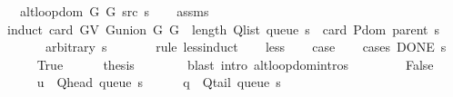 \begin{isabellebody}
\ \ \ {\isachardoublequoteopen}alt{\isacharunderscore}{\kern0pt}loop{\isacharunderscore}{\kern0pt}dom\ {\isacharparenleft}{\kern0pt}G{}{\isacharcomma}{\kern0pt}\ G{}{\isacharcomma}{\kern0pt}\ src{\isacharcomma}{\kern0pt}\ s{\isacharparenright}{\kern0pt}{\isachardoublequoteclose}\isanewline
%
\isadelimproof
\ \ %
\endisadelimproof
%
\isatagproof
{}\isamarkupfalse%
\ assms\isanewline
{}\isamarkupfalse%
\ {\isacharparenleft}{\kern0pt}induct\ {\isachardoublequoteopen}card\ {\isacharparenleft}{\kern0pt}G{\isachardot}{\kern0pt}V\ {\isacharparenleft}{\kern0pt}G{\isachardot}{\kern0pt}union\ G{}\ G{}{\isacharparenright}{\kern0pt}{\isacharparenright}{\kern0pt}\ {\isacharplus}{\kern0pt}\ length\ {\isacharparenleft}{\kern0pt}Q{\isacharunderscore}{\kern0pt}list\ {\isacharparenleft}{\kern0pt}queue\ s{\isacharparenright}{\kern0pt}{\isacharparenright}{\kern0pt}\ {\isacharminus}{\kern0pt}\ card\ {\isacharparenleft}{\kern0pt}P{\isachardot}{\kern0pt}dom\ {\isacharparenleft}{\kern0pt}parent\ s{\isacharparenright}{\kern0pt}{\isacharparenright}{\kern0pt}{\isachardoublequoteclose}\isanewline
\ \ \ \ \ \ \ arbitrary{\isacharcolon}{\kern0pt}\ s\isanewline
\ \ \ \ \ \ \ rule{\isacharcolon}{\kern0pt}\ less{\isacharunderscore}{\kern0pt}induct{\isacharparenright}{\kern0pt}\isanewline
\ \ \isamarkupfalse%
\ less\isanewline
\ \ \isamarkupfalse%
\ {\isacharquery}{\kern0pt}case\isanewline
\ \ \isamarkupfalse%
\ {\isacharparenleft}{\kern0pt}cases\ {\isachardoublequoteopen}DONE\ s{\isachardoublequoteclose}{\isacharparenright}{\kern0pt}\isanewline
\ \ \ \ \isamarkupfalse%
\ True\isanewline
\ \ \ \ \isamarkupfalse%
\ {\isacharquery}{\kern0pt}thesis\isanewline
\ \ \ \ \ \ \isamarkupfalse%
\ {\isacharparenleft}{\kern0pt}blast\ intro{\isacharcolon}{\kern0pt}\ alt{\isacharunderscore}{\kern0pt}loop{\isachardot}{\kern0pt}domintros{\isacharparenright}{\kern0pt}\isanewline
\ \ \isamarkupfalse%
\isanewline
\ \ \ \ \isamarkupfalse%
\ False\isanewline
\ \ \ \ \isamarkupfalse%
\ {\isacharquery}{\kern0pt}u\ {\isacharequal}{\kern0pt}\ {\isachardoublequoteopen}Q{\isacharunderscore}{\kern0pt}head\ {\isacharparenleft}{\kern0pt}queue\ s{\isacharparenright}{\kern0pt}{\isachardoublequoteclose}\isanewline
\ \ \ \ \isamarkupfalse%
\ {\isacharquery}{\kern0pt}q\ {\isacharequal}{\kern0pt}\ {\isachardoublequoteopen}Q{\isacharunderscore}{\kern0pt}tail\ {\isacharparenleft}{\kern0pt}queue\ s{\isacharparenright}{\kern0pt}{\isachardoublequoteclose}\isanewline

\end{isabellebody}

